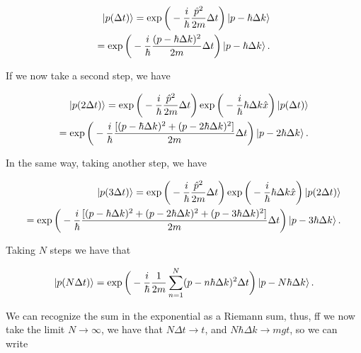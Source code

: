 \documentclass{article}
\begin{document}
\begin{equation}
    \begin{split}
        \ket{p(\Delta t)} = \exp \bigg( -\frac{i}{\hbar} \frac{\hat{p}^{2}}{2m} \Delta t \bigg) \ket{p-\hbar \Delta k} \\ = \exp \bigg( -\frac{i}{\hbar} \frac{(p-\hbar \Delta k)^{2}}{2m} \Delta t \bigg)\ket{p-\hbar \Delta k}.
    \end{split}
\end{equation}

If we now take a second step, we have

\begin{equation}
    \begin{split}
        \ket{p(2\Delta t)} = \exp \bigg( -\frac{i}{\hbar} \frac{\hat{p}^{2}}{2m} \Delta t \bigg) \exp \bigg(- \frac{i}{\hbar} \hbar \Delta k \hat{x} \bigg) \ket{p(\Delta t)} \\ = \exp \bigg( -\frac{i}{\hbar} \frac{[(p-\hbar \Delta k)^{2}+(p-2\hbar \Delta k)^{2}]}{2m} \Delta t \bigg) \ket{p - 2 \hbar \Delta k}.
    \end{split}
\end{equation}

In the same way, taking another step, we have

\begin{equation}
    \begin{split}
        \ket{p(3\Delta t)} = \exp \bigg( -\frac{i}{\hbar} \frac{\hat{p}^{2}}{2m} \Delta t \bigg) \exp \bigg(- \frac{i}{\hbar} \hbar \Delta k \hat{x} \bigg) \ket{p(2\Delta t)} \\ = \exp \bigg( -\frac{i}{\hbar} \frac{[(p-\hbar \Delta k)^{2}+(p-2\hbar \Delta k)^{2} + (p-3\hbar \Delta k)^{2}]}{2m} \Delta t \bigg) \ket{p - 3 \hbar \Delta k}.
    \end{split}
\end{equation}

Taking $N$ steps we have that

\begin{equation}
    \ket{p(N \Delta t)} = \exp \bigg(-\frac{i}{\hbar} \frac{1}{2m} \sum_{n=1}^{N} (p- n\hbar \Delta k)^{2} \Delta t \bigg) \ket{p-N\hbar \Delta k}.
\end{equation}

We can recognize the sum in the exponential as a Riemann sum, thus, ff we now take the limit $N \longrightarrow \infty$, we have that $N \Delta t \longrightarrow t$, and $N\hbar \Delta k \longrightarrow mgt$, so we can write
\end{document}

